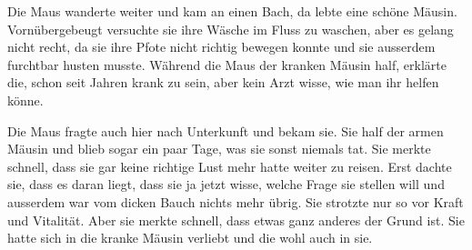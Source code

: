 Die Maus wanderte weiter und kam an einen Bach, da lebte eine schöne Mäusin. Vornübergebeugt versuchte sie ihre Wäsche im Fluss zu waschen, aber es gelang nicht recht, da sie ihre Pfote nicht richtig bewegen konnte und sie ausserdem furchtbar husten musste. Während die Maus der kranken Mäusin half, erklärte die, schon seit Jahren krank zu sein, aber kein Arzt wisse, wie man ihr helfen könne.

Die Maus fragte auch hier nach Unterkunft und bekam sie. Sie half der armen Mäusin und blieb sogar ein paar Tage, was sie sonst niemals tat. Sie merkte schnell, dass sie gar keine richtige Lust mehr hatte weiter zu reisen. Erst dachte sie, dass es daran liegt, dass sie ja jetzt wisse, welche Frage sie stellen will und ausserdem war vom dicken Bauch nichts mehr übrig. Sie strotzte nur so vor Kraft und Vitalität. Aber sie merkte schnell, dass etwas ganz anderes der Grund ist. Sie hatte sich in die kranke Mäusin verliebt und die wohl auch in sie.

